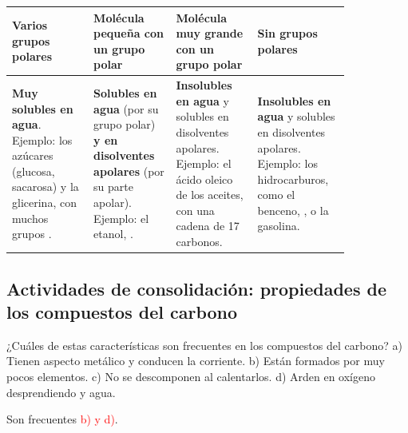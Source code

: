 \begin{center}
    {\small
    \begin{tabular}{@{}L{0.21\linewidth} L{0.21\linewidth} L{0.21\linewidth} L{0.21\linewidth}@{}}
        \toprule
        \textbf{Varios grupos polares} & \textbf{Molécula pequeña con un grupo polar} & \textbf{Molécula muy grande con un grupo polar} & \textbf{Sin grupos polares} \\
        \midrule
        \textbf{Muy solubles en agua}. Ejemplo: los azúcares (glucosa, sacarosa) y la glicerina, con muchos grupos . & \textbf{Solubles en agua} (por su grupo polar) \textbf{y en disolventes apolares} (por su parte apolar). Ejemplo: el etanol, . & \textbf{Insolubles en agua} y solubles en disolventes apolares. Ejemplo: el ácido oleico de los aceites, con una cadena de 17 carbonos. & \textbf{Insolubles en agua} y solubles en disolventes apolares. Ejemplo: los hidrocarburos, como el benceno, , o la gasolina. \\
        \bottomrule
    \end{tabular}
    }
\end{center}

\subsection*{Actividades de consolidación: propiedades de los compuestos del carbono}

\begin{exercise}
    ¿Cuáles de estas características son frecuentes en los compuestos del carbono? a) Tienen aspecto metálico y conducen la corriente. b) Están formados por muy pocos elementos. c) No se descomponen al calentarlos. d) Arden en oxígeno desprendiendo  y agua.
    \begin{solu}
        Son frecuentes \textcolor{red}{b) y d)}.
    \end{solu}
\end{exercise}

